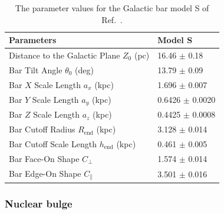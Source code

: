 \documentclass[doublespace,nopageskip]{VTthesis} %
\begin{document}

\begin{table}[htb]
\centering
\caption{ The parameter values for the Galactic bar model S of Ref.~\cite{1998ApJ...492..495F}.}
    \begin{tabular}{ll}
    \toprule
      Parameters & Model S \\ 
      \midrule
      Distance to the Galactic Plane $Z_0$ (pc) & 16.46 $\pm$ 0.18\\
      Bar Tilt Angle $\theta_0$ (deg) & 13.79 $\pm$ 0.09\\
      Bar $X$ Scale Length $a_x$ (kpc) & 1.696 $\pm$ 0.007 \\
      Bar $Y$ Scale Length $a_y$ (kpc) & 0.6426 $\pm$ 0.0020 \\
      Bar $Z$ Scale Length $a_z$ (kpc) & 0.4425 $\pm$ 0.0008 \\
      Bar Cutoff Radius $R_{\text{end}}$ (kpc) & 3.128 $\pm$ 0.014 \\
      Bar Cutoff Scale Length $h_{\text{end}}$ (kpc) & 0.461 $\pm$ 0.005 \\
      Bar Face-On Shape $C_\perp$ & 1.574 $\pm$ 0.014 \\
      Bar Edge-On Shape $C_\parallel$ & 3.501 $\pm$ 0.016\\
      \bottomrule
    \end{tabular}
\label{tab:modelS}
\end{table}

\subsubsection{Nuclear bulge}\label{sec:nb}
\end{document}

